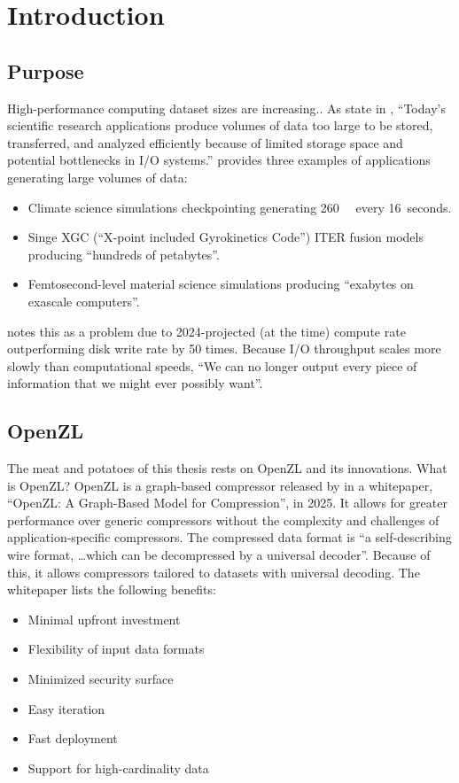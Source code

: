 \chapter{Introduction}
\label{sec:intro}
\section{Purpose}
High-performance computing dataset sizes are
increasing.\cite{reed_exascale_2015}. As \citeauthor{underwood_fraz_2020} state
in \cite{underwood_fraz_2020}, ``Today’s scientific research applications
produce volumes of data too large to be stored, transferred, and analyzed
efficiently because of limited storage space and potential bottlenecks in I/O
systems.'' \cite{foster_computing_2017} provides three examples of applications
generating large volumes of data:
\begin{itemize}
\item Climate science simulations checkpointing generating \qty{260}{\tera\byte}
  every 16~seconds.
\item Singe XGC (``X-point included Gyrokinetics Code'') ITER fusion models
  producing ``hundreds of petabytes''\cite{foster_computing_2017}.
\item Femtosecond-level material science simulations producing ``exabytes on
  exascale computers''\cite{foster_computing_2017}.
\end{itemize}

\cite{foster_computing_2017} notes this as a problem due to 2024-projected (at
the time) compute rate outperforming disk write rate by 50 times. Because I/O
throughput scales more slowly than computational speeds, ``We can no longer
output every piece of information that we might ever possibly
want''\cite{foster_computing_2017}.

\section{OpenZL}
The meat and potatoes of this thesis rests on OpenZL and its innovations. What
is OpenZL? OpenZL is a graph-based compressor released by \metainc{} in a
whitepaper, ``OpenZL: A Graph-Based Model for
Compression''\cite{collet_openzl_2025}, in 2025. It allows for greater
performance over generic compressors without the complexity and challenges of
application-specific compressors. The compressed data format is ``a
self-describing wire format, \ldots which can be decompressed by a universal
decoder''\cite{collet_openzl_2025}. Because of this, it allows compressors
tailored to datasets with universal decoding. The whitepaper lists the following
benefits:
\begin{itemize}
\item Minimal upfront investment
\item Flexibility of input data formats
\item Minimized security surface
\item Easy iteration
\item Fast deployment
\item Support for high-cardinality data
\end{itemize}

